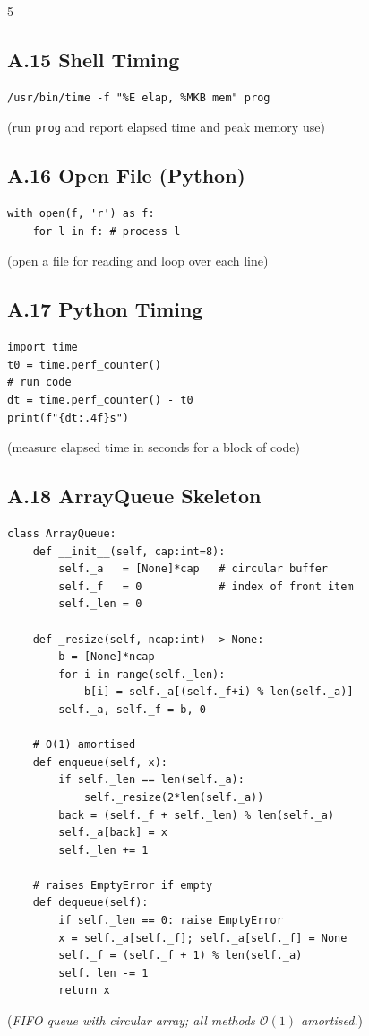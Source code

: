 \documentclass[6pt,landscape]{article}
\begin{document}
\begin{multicols}{5}
\subsection{A.15 Shell Timing}\label{code:A15}
\begin{verbatim}
/usr/bin/time -f "%E elap, %MKB mem" prog
\end{verbatim}
(run \texttt{prog} and report elapsed time and peak memory use)

\subsection{A.16 Open File (Python)}\label{code:A16}
\begin{verbatim}
with open(f, 'r') as f:
    for l in f: # process l
\end{verbatim}
(open a file for reading and loop over each line)

\subsection{A.17 Python Timing}\label{code:A17}
\begin{verbatim}
import time
t0 = time.perf_counter()
# run code
dt = time.perf_counter() - t0
print(f"{dt:.4f}s")
\end{verbatim}
(measure elapsed time in seconds for a block of code)

\subsection{A.18 ArrayQueue Skeleton}\label{code:A18}
\begin{verbatim}
class ArrayQueue:
    def __init__(self, cap:int=8):
        self._a   = [None]*cap   # circular buffer
        self._f   = 0            # index of front item
        self._len = 0

    def _resize(self, ncap:int) -> None:
        b = [None]*ncap
        for i in range(self._len):
            b[i] = self._a[(self._f+i) % len(self._a)]
        self._a, self._f = b, 0

    # O(1) amortised
    def enqueue(self, x):
        if self._len == len(self._a):
            self._resize(2*len(self._a))
        back = (self._f + self._len) % len(self._a)
        self._a[back] = x
        self._len += 1

    # raises EmptyError if empty
    def dequeue(self):
        if self._len == 0: raise EmptyError
        x = self._a[self._f]; self._a[self._f] = None
        self._f = (self._f + 1) % len(self._a)
        self._len -= 1
        return x
\end{verbatim}
(\textit{FIFO queue with circular array; all methods $\mathcal O(1)$ amortised.})


\end{multicols}
\end{document}
